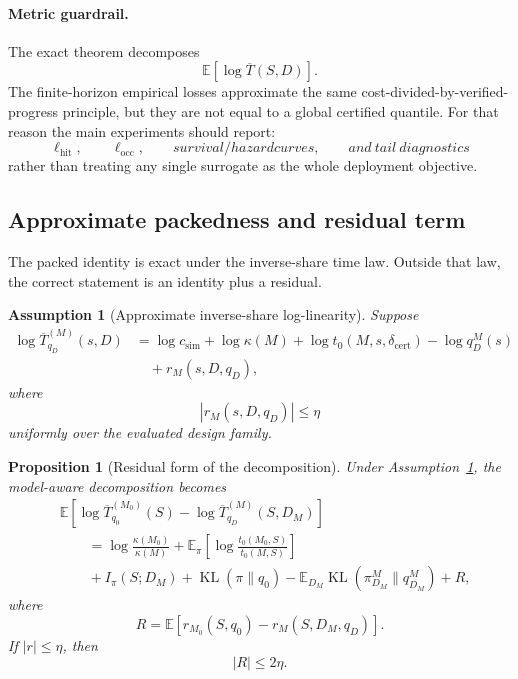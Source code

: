 \documentclass{article}
\newtheorem{assumption}{Assumption}
\newtheorem{proposition}{Proposition}
\DeclareMathOperator{\KL}{KL}
\newcommand{\E}{\mathbb{E}}
\begin{document}
\paragraph{Metric guardrail.}
The exact theorem decomposes
\[
    \E[\log \overline T(S,D)].
\]
The finite-horizon empirical losses approximate the same cost-divided-by-verified-progress
principle, but they are not equal to a global certified quantile.
For that reason the main experiments should report:
\[
    \ell_{\mathrm{hit}},
    \qquad
    \ell_{\mathrm{occ}},
    \qquad
    survival/hazard curves,
    \qquad
    and\ tail\ diagnostics
\]
rather than treating any single surrogate as the whole deployment objective.

\subsection{Approximate packedness and residual term}

The packed identity is exact under the inverse-share time law.
Outside that law, the correct statement is an identity plus a residual.

\begin{assumption}[Approximate inverse-share log-linearity]
\label{ass:app-approx-log-linear}
Suppose
\[
\begin{aligned}
    \log \overline T^{(M)}_{q_D}(s,D)
    &=
    \log c_{\mathrm{sim}}
    +
    \log\kappa(M)
    +
    \log t_0(M,s,\delta_{\mathrm{cert}})
    -
    \log q_D^M(s)
    \\
    &\quad
    +
    r_M(s,D,q_D),
\end{aligned}
\]
where
\[
    |r_M(s,D,q_D)|\le \eta
\]
uniformly over the evaluated design family.
\end{assumption}

\begin{proposition}[Residual form of the decomposition]
\label{prop:app-residual-decomp}
Under Assumption~\ref{ass:app-approx-log-linear}, the model-aware decomposition becomes
\[
\begin{aligned}
&\E[
    \log \overline T^{(M_0)}_{q_0}(S)
    -
    \log \overline T^{(M)}_{q_D}(S,D_M)
]
\\
&\qquad =
\log\frac{\kappa(M_0)}{\kappa(M)}
+
\E_\pi
\left[
    \log\frac{t_0(M_0,S)}{t_0(M,S)}
\right]
\\
&\qquad
+
I_\pi(S;D_M)
+
\KL(\pi\|q_0)
-
\E_{D_M}\KL(\pi_{D_M}^M\|q_{D_M}^M)
+
R,
\end{aligned}
\]
where
\[
    R
    =
    \E[r_{M_0}(S,q_0)-r_M(S,D_M,q_D)].
\]
If \(|r|\le\eta\), then
\[
    |R|\le 2\eta.
\]
\end{proposition}
\end{document}
